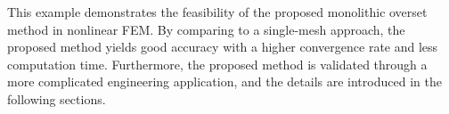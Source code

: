 \documentclass[preprint,12pt,sort&compress]{elsarticle}
\theoremstyle{definition}%
\begin{document}
This example demonstrates the feasibility of the proposed monolithic overset method in nonlinear FEM.
By comparing to a single-mesh approach, the proposed method yields good accuracy with a higher convergence rate and less computation time. Furthermore, the proposed method is validated through a more complicated engineering application, and the details are introduced in the following sections. 

\end{document}
